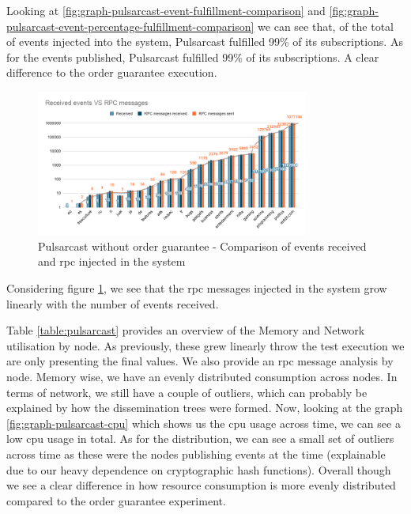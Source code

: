 Looking at \ref{fig:graph-pulsarcast-event-fulfillment-comparison} and
\ref{fig:graph-pulsarcast-event-percentage-fulfillment-comparison} we can see
that, of the total of events injected into the system, Pulsarcast fulfilled
99\% of its subscriptions. As for the events published, Pulsarcast fulfilled
99\% of its subscriptions. A clear difference to the order guarantee execution.

\begin{figure}[!htb]
  \centering
  \includegraphics[width=0.8\textwidth]{img/graph-pulsarcast-rpc.png}
  \caption{Pulsarcast without order guarantee - Comparison of events received and \acrshort{rpc} injected in the system}
  \label{fig:graph-pulsarcast-rpc}
\end{figure}

Considering figure \ref{fig:graph-pulsarcast-rpc}, we see that the \acrshort{rpc} messages
injected in the system grow linearly with the number of events received.

Table \ref{table:pulsarcast} provides an overview of the Memory and Network
utilisation by node. As previously, these grew linearly throw the test
execution we are only presenting the final values. We also provide an \acrshort{rpc}
message analysis by node. Memory wise, we have an evenly distributed
consumption across nodes. In terms of network, we still have a couple of
outliers, which can probably be explained by how the dissemination trees were
formed.  Now, looking at the graph \ref{fig:graph-pulsarcast-cpu} which shows
us the \acrshort{cpu} usage across time, we can see a low \acrshort{cpu} usage in total. As for the
distribution, we can see a small set of outliers across time as these were the
nodes publishing events at the time (explainable due to our heavy dependence on
cryptographic hash functions).  Overall though we see a clear difference in how
resource consumption is more evenly distributed compared to the order guarantee
experiment.


